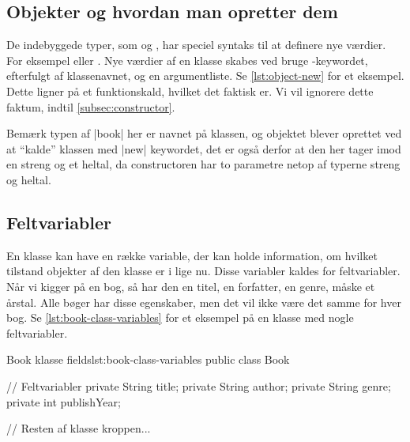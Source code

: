 \subsection{Objekter og hvordan man opretter dem}

De indebyggede typer, som  og , har
speciel syntaks til at definere nye værdier. For eksempel
 eller . Nye værdier af en
klasse skabes ved bruge -keywordet, efterfulgt af
klassenavnet, og en argumentliste. Se \autoref{lst:object-new} for
et eksempel. Dette ligner på et funktionskald, hvilket det faktisk er.
Vi vil ignorere dette faktum, indtil \autoref{subsec:constructor}.

\begin{JavaCode}{Oprettelse af et objekt af typen Book.}{lst:object-new}
	// En variable af type bog.
	Book book = new Book("Nineteen Eighty-Four", 1949);
}
\end{JavaCode}

Bemærk typen af \JavaInline|book| her er navnet på klassen, og
objektet blever oprettet ved at ``kalde'' klassen med
\JavaInline|new| keywordet, det er også derfor at den her tager imod
en streng og et heltal, da constructoren har to parametre netop af
typerne streng og heltal.

\subsection{Feltvariabler}

En klasse kan have en række variable, der kan holde information, om
hvilket tilstand objekter af den klasse er i lige nu. Disse variabler
kaldes for feltvariabler. Når vi kigger på en bog, så har den en
titel, en forfatter, en genre, måske et årstal. Alle bøger har disse
egenskaber, men det vil ikke være det samme for hver bog. Se
\autoref{lst:book-class-variables} for et eksempel på en klasse med
nogle feltvariabler.

\begin{JavaCode}{Book klasse fields}{lst:book-class-variables}
	public class Book {

		// Feltvariabler
		private String title;
		private String author;
		private String genre;
		private int publishYear;

		// Resten af klasse kroppen...
	}
\end{JavaCode}



